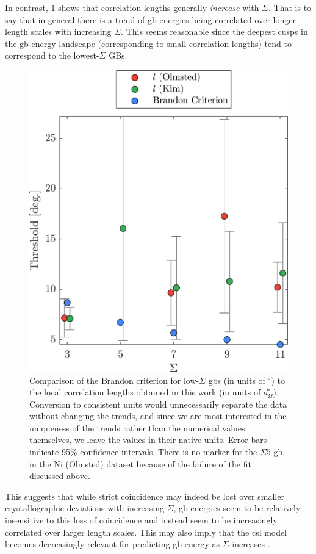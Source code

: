 \documentclass[final,twocolumn,12pt]{elsarticle}
\begin{document}
    In contrast, \cref{fig:brandoncriterioncomparison} shows that correlation lengths generally \emph{increase} with $\Sigma$. That is to say that in general there is a trend of \gls{gb} energies being correlated over longer length scales with increasing $\Sigma$. This seems reasonable since the deepest cusps in the \gls{gb} energy landscape (corresponding to small correlation lengths) tend to correspond to the lowest-$\Sigma$ GBs.
    \begin{figure}
        \centering
        \includegraphics[scale=1]{figures/BrandonCriterionComparison.png}
        \caption{Comparison of the Brandon criterion \cite{brandonStructureHighangleGrain1966a} for low-$\Sigma$ \glspl{gb} (in units of ${}^{\circ}$) to the local correlation lengths obtained in this work (in units of $d_{\Omega}^{\circ}$). Conversion to consistent units would unnecessarily separate the data without changing the trends, and since we are most interested in the uniqueness of the trends rather than the numerical values themselves, we leave the values in their native units. Error bars indicate 95\% confidence intervals. There is no marker for the $\Sigma 5$ \gls{gb} in the Ni (Olmsted) dataset because of the failure of the fit discussed above.}
        \label{fig:brandoncriterioncomparison}
    \end{figure}
    This suggests that while strict coincidence may indeed be lost over smaller crystallographic deviations with increasing $\Sigma$, \gls{gb} energies seem to be relatively insensitive to this loss of coincidence and instead seem to be increasingly correlated over larger length scales. This may also imply that the \gls{csl} model becomes decreasingly relevant for predicting \gls{gb} energy as $\Sigma$ increases \cite{kingWhatDoesIt2006}.
\end{document}
